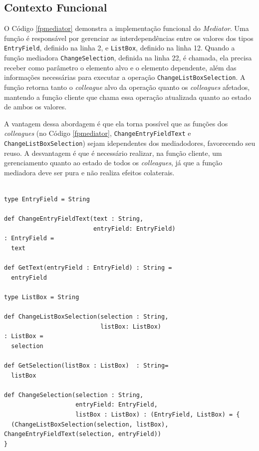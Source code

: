 \subsection*{Contexto Funcional}

O Código \ref{fpmediator} demonstra a implementação 
funcional do \textit{Mediator}. Uma função é responsável por 
gerenciar as interdependências entre os valores 
dos tipos \texttt{EntryField}, definido na linha 2, e \texttt{ListBox}, 
definido na linha 12. Quando a função mediadora \texttt{ChangeSelection}, 
definida na linha 22, é chamada, ela precisa receber 
como parâmetro o elemento alvo e o elemento dependente, 
além das informações necessárias para executar a 
operação \texttt{ChangeListBoxSelection}. A função retorna 
tanto o \textit{colleague} alvo da operação 
quanto os \textit{colleagues} afetados, mantendo 
a função cliente que chama essa operação atualizada 
quanto ao estado de ambos os valores. 

A vantagem dessa abordagem é que ela torna possível 
que as funções dos \textit{colleagues} (no Código 
\ref{fpmediator}, \texttt{ChangeEntryFieldText} e 
\texttt{ChangeListBoxSelection}) sejam idependentes dos 
mediadodores, favorecendo seu reuso. A desvantagem 
é que é necessário realizar, na função cliente, 
um gerenciamento quanto ao estado de todos os 
\textit{colleagues}, já que a função mediadora 
deve ser pura e não realiza efeitos colaterais.

\begin{lstlisting}[caption={\textit{Mediator} Funcional.},label=fpmediator]
    
type EntryField = String

def ChangeEntryFieldText(text : String,
						 entryField: EntryField)
: EntryField =
  text
  
def GetText(entryField : EntryField) : String =
  entryField
  
type ListBox = String
  
def ChangeListBoxSelection(selection : String,
						   listBox: ListBox)
: ListBox =
  selection
  
def GetSelection(listBox : ListBox)  : String=
  listBox
  
def ChangeSelection(selection : String,
					entryField: EntryField,
					listBox : ListBox) : (EntryField, ListBox) = {
  (ChangeListBoxSelection(selection, listBox), ChangeEntryFieldText(selection, entryField))
}
	    
\end{lstlisting}
